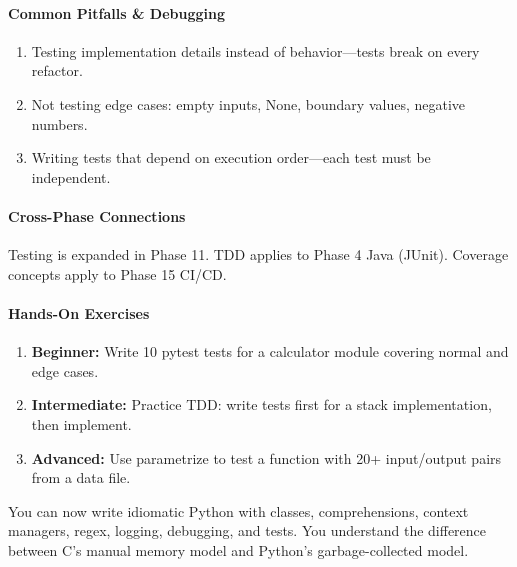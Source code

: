 \documentclass[11pt, a4paper, oneside]{report}
\begin{document}
\paragraph{Common Pitfalls \& Debugging}
\begin{enumerate}[leftmargin=*]
\item Testing implementation details instead of behavior---tests break on every refactor.
\item Not testing edge cases: empty inputs, None, boundary values, negative numbers.
\item Writing tests that depend on execution order---each test must be independent.
\end{enumerate}

\paragraph{Cross-Phase Connections} Testing is expanded in Phase 11. TDD applies to Phase 4 Java (JUnit). Coverage concepts apply to Phase 15 CI/CD.

\paragraph{Hands-On Exercises}
\begin{enumerate}[leftmargin=*]
\item \textbf{Beginner:} Write 10 pytest tests for a calculator module covering normal and edge cases.
\item \textbf{Intermediate:} Practice TDD: write tests first for a stack implementation, then implement.
\item \textbf{Advanced:} Use parametrize to test a function with 20+ input/output pairs from a data file.
\end{enumerate}

\begin{microcheckpoint}
You can now write idiomatic Python with classes, comprehensions, context managers, regex, logging, debugging, and tests. You understand the difference between C's manual memory model and Python's garbage-collected model.
\end{microcheckpoint}
\end{document}
